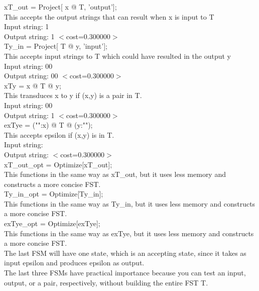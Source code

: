 \documentclass[11pt]{article} %
\begin{document}
xT\_out = Project[ x @ T, ’output’];\\
This accepts the output strings that can result when x is input to T\\
Input string: 1\\
Output string: 1 $<$cost=0.300000$>$\\

Ty\_in = Project[ T @ y, ’input’];\\
This accepts input strings to T which could have resulted in the output y\\
Input string: 00\\
Output string: 00 $<$cost=0.300000$>$\\

xTy = x @ T @ y; \\
This transduces x to y if (x,y) is a pair in T.\\
Input string: 00\\
Output string: 1 $<$cost=0.300000$>$\\
exTye = ("":x) @ T @ (y:"");\\
This accepts epsilon if (x,y) is in T.\\
Input string: \\
Output string:  $<$cost=0.300000$>$\\

xT\_out\_opt = Optimize[xT\_out];\\
This functions in the same way as xT\_out, but it uses less memory and constructs a more concise FST.\\

Ty\_in\_opt = Optimize[Ty\_in];\\
This functions in the same way as Ty\_in, but it uses less memory and constructs a more concise FST.\\

exTye\_opt = Optimize[exTye];\\
This functions in the same way as exTye, but it uses less memory and constructs a more concise FST.\\

The last FSM will have one state, which is an accepting state, since it takes as input epsilon and produces epsilon as output.\\

The last three FSMs have practical importance because you can test an input, output, or a pair, respectively, without building the entire FST T.

\newpage
\section{}
\end{document}
